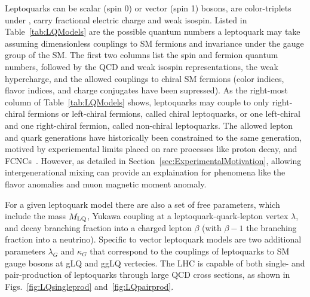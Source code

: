 

Leptoquarks can be scalar (spin 0) or vector (spin 1) bosons, are color-triplets under \SUthreeC, carry fractional electric charge and weak isospin. Listed in Table~\ref{tab:LQModels} are the possible quantum numbers a leptoquark may take assuming dimensionless couplings to SM fermions and invariance under the gauge group of the SM. The first two columns list the spin and fermion quantum numbers, followed by the QCD and weak isospin representations, the weak hypercharge, and the allowed couplings to chiral SM fermions (color indices, flavor indices, and charge conjugates have been supressed). As the right-most column of Table~\ref{tab:LQModels} shows, leptoquarks may couple to only right-chiral fermions or left-chiral fermions, called chiral leptoquarks, or one left-chiral and one right-chiral fermion, called non-chiral leptoquarks. The allowed lepton and quark generations have historically been constrained to the same generation, motived by experiemental limits placed on rare processes like proton decay, and FCNCs~\cite{FCNC}. However, as detailed in Section~\ref{sec:ExperimentalMotivation}, allowing intergenerational mixing can provide an explaination for phenomena like the flavor anomalies and muon magnetic moment anomaly. 

For a given leptoquark model there are also a set of free parameters, which include the mass $M_{\mathrm{LQ}}$, Yukawa coupling at a leptoquark-quark-lepton vertex $\lambda$, and decay branching fraction into a charged lepton $\beta$ (with $\beta-1$ the branching fraction into a neutrino). Specific to vector leptoquark models are two additional parameters $\lambda_G$ and $\kappa_G$ that correspond to the couplings of leptoquarks to SM gauge bosons at gLQ and ggLQ vertecies. The LHC is capable of both single- and pair-production of leptoquarks through large QCD cross sections, as shown in Figs.~\ref{fig:LQsingleprod} and~\ref{fig:LQpairprod}. 

